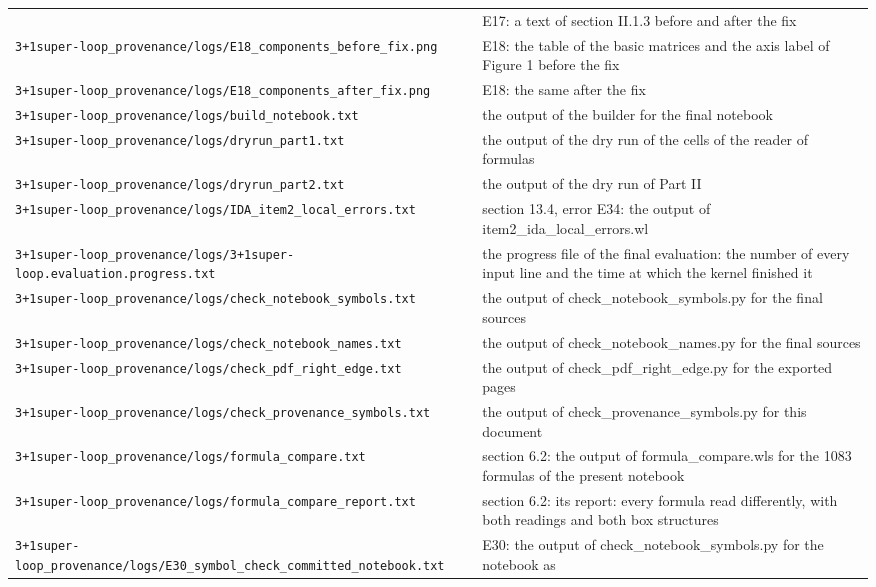\documentclass[
  10pt,
]{article}
\begin{document}
\begin{longtable}[]{@{}
  >{\raggedright\arraybackslash}p{}
  >{\raggedright\arraybackslash}p{}@{}}
& E17: a text of section II.1.3 before and after the fix \\
\texttt{3+1super-loop\_provenance/logs/E18\_components\_before\_fix.png}
& E18: the table of the basic matrices and the axis label of Figure 1
before the fix \\
\texttt{3+1super-loop\_provenance/logs/E18\_components\_after\_fix.png}
& E18: the same after the fix \\
\texttt{3+1super-loop\_provenance/logs/build\_notebook.txt} & the output
of the builder for the final notebook \\
\texttt{3+1super-loop\_provenance/logs/dryrun\_part1.txt} & the output
of the dry run of the cells of the reader of formulas \\
\texttt{3+1super-loop\_provenance/logs/dryrun\_part2.txt} & the output
of the dry run of Part II \\
\texttt{3+1super-loop\_provenance/logs/IDA\_item2\_local\_errors.txt} &
section 13.4, error E34: the output of item2\_ida\_local\_errors.wl \\
\texttt{3+1super-loop\_provenance/logs/3+1super-loop.evaluation.progress.txt}
& the progress file of the final evaluation: the number of every input
line and the time at which the kernel finished it \\
\texttt{3+1super-loop\_provenance/logs/check\_notebook\_symbols.txt} &
the output of check\_notebook\_symbols.py for the final sources \\
\texttt{3+1super-loop\_provenance/logs/check\_notebook\_names.txt} & the
output of check\_notebook\_names.py for the final sources \\
\texttt{3+1super-loop\_provenance/logs/check\_pdf\_right\_edge.txt} &
the output of check\_pdf\_right\_edge.py for the exported pages \\
\texttt{3+1super-loop\_provenance/logs/check\_provenance\_symbols.txt} &
the output of check\_provenance\_symbols.py for this document \\
\texttt{3+1super-loop\_provenance/logs/formula\_compare.txt} & section
6.2: the output of formula\_compare.wls for the 1083 formulas of the
present notebook \\
\texttt{3+1super-loop\_provenance/logs/formula\_compare\_report.txt} &
section 6.2: its report: every formula read differently, with both
readings and both box structures \\
\texttt{3+1super-loop\_provenance/logs/E30\_symbol\_check\_committed\_notebook.txt}
& E30: the output of check\_notebook\_symbols.py for the notebook as

\end{longtable}
\end{document}
